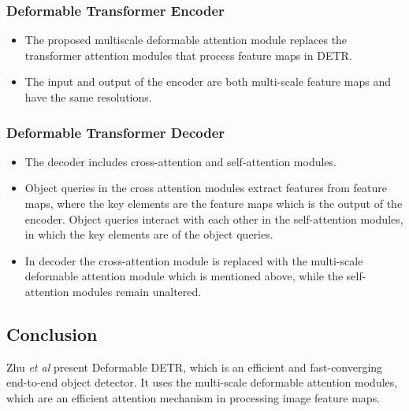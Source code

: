 \subsubsection{Deformable Transformer Encoder}
\begin{itemize}
	\item The proposed multiscale deformable attention module replaces the transformer attention modules that process feature maps in DETR.
	\item The input and output of the encoder are both multi-scale feature maps and have the same resolutions.
\end{itemize}	


\subsubsection{Deformable Transformer Decoder}

\begin{itemize}
	\item The decoder includes cross-attention and self-attention modules.
	\item Object queries in the cross attention modules extract features from feature maps, where the key elements are the feature maps which is the output of the encoder. Object queries interact with each other in the self-attention modules, in which the key elements are of the object queries.
	\item In decoder the cross-attention module is replaced with the multi-scale deformable attention module which is mentioned above, while the self-attention modules remain unaltered.
\end{itemize}
\subsection{Conclusion}
\par Zhu \textit{et al} present Deformable DETR, which is an efficient and fast-converging end-to-end object detector. It uses the multi-scale deformable attention modules, which are an efficient attention mechanism in processing image feature maps.